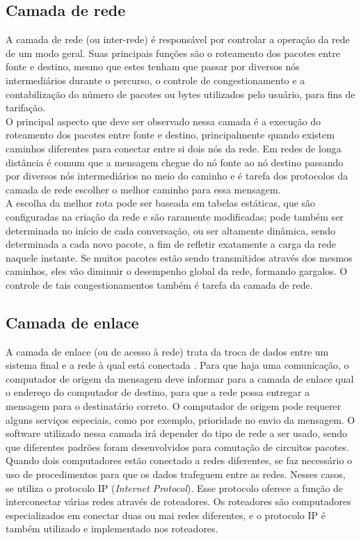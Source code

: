 \subsection{Camada de rede}
A camada de rede (ou inter-rede) é responsável por controlar a operação da rede 
de um modo geral. Suas principais funções são o roteamento dos pacotes entre 
fonte e destino, mesmo que estes tenham que passar por diversos nós 
intermediários durante o percurso, o controle de congestionamento e a 
contabilização do número de pacotes ou bytes utilizados pelo usuário, para fins 
de tarifação.\\
O principal aspecto que deve ser observado nessa camada é a execução do 
roteamento dos pacotes entre fonte e destino, principalmente quando existem 
caminhos diferentes para conectar entre si dois nós da rede. Em redes de longa 
distância é comum que a mensagem chegue do nó fonte ao nó destino passando por 
diversos nós intermediários no meio do caminho e é tarefa dos protocolos da 
camada de rede escolher o melhor caminho para essa mensagem.\\
A escolha da melhor rota pode ser baseada em tabelas estáticas, que são 
configuradas na criação da rede e são raramente modificadas; pode também ser 
determinada no início de cada conversação, ou ser altamente dinâmica, sendo 
determinada a cada novo pacote, a fim de refletir exatamente a carga da rede 
naquele instante. Se muitos pacotes estão sendo transmitidos através dos mesmos 
caminhos, eles vão diminuir o desempenho global da rede, formando gargalos. O 
controle de tais congestionamentos também é tarefa da camada de rede.\\
\subsection{Camada de enlace}
A camada de enlace (ou de acesso à rede) trata da troca de dados entre um 
sistema final e a rede à qual está conectada \cite{stallings2005}. Para que 
haja uma comunicação, o computador de origem da mensagem deve informar para a 
camada de enlace qual o endereço do computador de destino, para que a rede 
possa entregar a mensagem para o destinatário correto. O computador de origem 
pode requerer alguns serviços especiais, como por exemplo, prioridade no envio 
da mensagem. O software utilizado nessa camada irá depender do tipo de rede a 
ser usado, sendo que diferentes padrões foram desenvolvidos para comutação de 
circuitos pacotes.\\
Quando dois computadores estão conectado a redes diferentes, se faz necessário 
o uso de procedimentos para que os dados trafeguem entre as redes. Nesses 
casos, se utiliza o protocolo IP (\textit{Internet Protocol}). Esse protocolo 
oferece a função de interconectar várias redes através de roteadores. Os 
roteadores são computadores especializados em conectar duas ou mai redes 
diferentes, e o protocolo IP é também utilizado e implementado nos roteadores.
